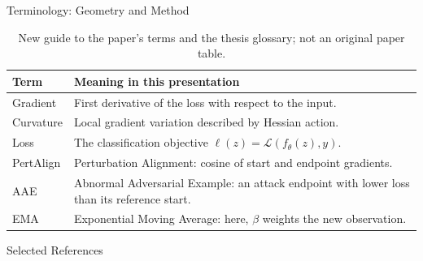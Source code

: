 \documentclass[11pt,aspectratio=169,professionalfonts]{beamer}
\begin{document}
\begin{frame}{Terminology: Geometry and Method}
\begin{table}
\centering\fontsize{11}{14}\selectfont\renewcommand{\arraystretch}{1.15}
\begin{tabular}{p{.24\linewidth}>{\raggedright\arraybackslash}p{.64\linewidth}}
\toprule
Term & Meaning in this presentation\\\midrule
Gradient & First derivative of the loss with respect to the input.\\
Curvature & Local gradient variation described by Hessian action.\\
Loss & The classification objective $\ell(z)=\mathcal L(f_\theta(z),y)$.\\
PertAlign & Perturbation Alignment: cosine of start and endpoint gradients.\\
AAE & Abnormal Adversarial Example: an attack endpoint with lower loss than its reference start.\\
EMA & Exponential Moving Average: here, $\beta$ weights the new observation.\\
\bottomrule
\end{tabular}
\caption{New guide to the paper's terms \cite{sora2026} and the thesis glossary; not an original paper table.}
\end{table}
\end{frame}

\begin{frame}[allowframebreaks]{Selected References}
\fontsize{10}{12}\selectfont


\end{frame}
\end{document}
